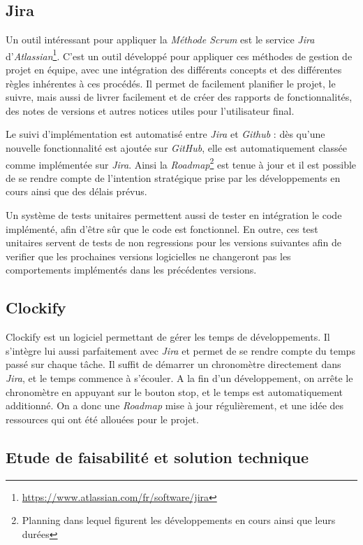 		\subsection{Jira}

			Un outil intéressant pour appliquer la \textit{Méthode Scrum} est le service \textit{Jira} d'\textit{Atlassian}\footnote{\url{https://www.atlassian.com/fr/software/jira}}. C'est un outil développé pour appliquer ces méthodes de gestion de projet en équipe, avec une intégration des différents concepts et des différentes règles inhérentes à ces procédés. Il permet de facilement planifier le projet, le suivre, mais aussi de livrer facilement et de créer des rapports de fonctionnalités, des notes de versions et autres notices utiles pour l'utilisateur final.
		
			Le suivi d'implémentation est automatisé entre \textit{Jira} et \textit{Github} : dès qu'une nouvelle fonctionnalité est ajoutée sur \textit{GitHub}, elle est automatiquement classée comme implémentée sur \textit{Jira}. Ainsi la \textit{Roadmap}\footnote{Planning dans lequel figurent les développements en cours ainsi que leurs durées} est tenue à jour et il est possible de se rendre compte de l'intention stratégique prise par les développements en cours ainsi que des délais prévus.

			Un système de tests unitaires permettent aussi de tester en intégration le code implémenté, afin d'être sûr que le code est fonctionnel. En outre, ces test unitaires servent de tests de non regressions pour les versions suivantes afin de verifier que les prochaines versions logicielles ne changeront pas les comportements implémentés dans les précédentes versions.

		\subsection{Clockify}
			
			Clockify est un logiciel permettant de gérer les temps de développements. Il s'intègre lui aussi parfaitement avec \textit{Jira} et permet de se rendre compte du temps passé sur chaque tâche. Il suffit de démarrer un chronomètre directement dans \textit{Jira}, et le temps commence à s'écouler. A la fin d'un développement, on arrête le chronomètre en appuyant sur le bouton stop, et le temps est automatiquement additionné. On a donc une \textit{Roadmap} mise à jour régulièrement, et une idée des ressources qui ont été allouées pour le projet.

		\subsection{Etude de faisabilité et solution technique}


